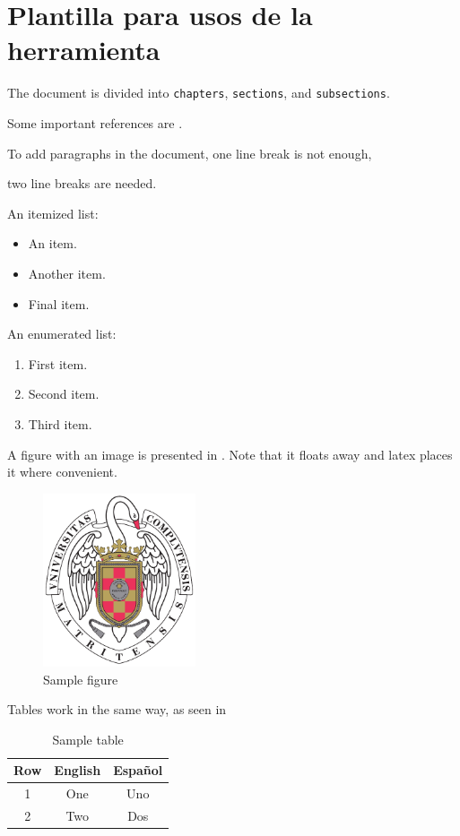 \section{Plantilla para usos de la herramienta}
		The document is divided into \texttt{chapters}, \texttt{sections}, and \texttt{subsections}.

		Some important references are \cite{einstein,latexcompanion,knuthwebsite}.

		To add paragraphs in the document, 
		one line break is not enough,

		two line breaks are needed.

		An itemized list:

		\begin{itemize}
			\item An item.
			\item Another item.
			\item Final item.
		\end{itemize}

		An enumerated list:

		\begin{enumerate}
			\item First item.
			\item Second item.
			\item Third item.
		\end{enumerate}

		A figure with an image is presented in . Note that it floats away and latex places it where convenient.

		\begin{figure}[h!]
			\centering
			\includegraphics[width=0.4\textwidth]{./Images/escudo_ucm.pdf}
			\caption{Sample figure}
			\label{fig:logo_ucm}
		\end{figure}

		Tables work in the same way, as seen in 

		\begin{table}[h!]
			\centering
			\begin{tabular}{c|c|c}
				Row & English & Español \\\hline\hline
				1 & One & Uno \\
				2 & Two & Dos \\
			\end{tabular}
			\caption{Sample table}
			\label{tab:tabla}
		\end{table}
	\blindtext